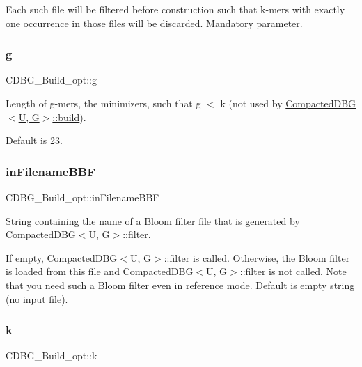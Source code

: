 Each such file will be filtered before construction such that k-\/mers with exactly one occurrence in those files will be discarded. Mandatory parameter. \mbox{\label{structCDBG__Build__opt_ab8d8ec72715094561d247b45ed5887f0}} 
\subsubsection{\texorpdfstring{g}{g}}
{\footnotesize\ttfamily C\+D\+B\+G\+\_\+\+Build\+\_\+opt\+::g}



Length of g-\/mers, the minimizers, such that g $<$ k (not used by \hyperlink{classCompactedDBG_a6021ad2fe7b11998b886bc5fd9e1a4ba}{Compacted\+D\+B\+G$<$\+U, G$>$\+::build}). 

Default is 23. \mbox{\label{structCDBG__Build__opt_aede0acb7ddd4b5bf7c6c539a86461d15}} 
\subsubsection{\texorpdfstring{in\+Filename\+B\+BF}{inFilenameBBF}}
{\footnotesize\ttfamily C\+D\+B\+G\+\_\+\+Build\+\_\+opt\+::in\+Filename\+B\+BF}



String containing the name of a Bloom filter file that is generated by Compacted\+D\+B\+G$<$\+U, G$>$\+::filter. 

If empty, Compacted\+D\+B\+G$<$\+U, G$>$\+::filter is called. Otherwise, the Bloom filter is loaded from this file and Compacted\+D\+B\+G$<$\+U, G$>$\+::filter is not called. Note that you need such a Bloom filter even in reference mode. Default is empty string (no input file). \mbox{\label{structCDBG__Build__opt_af59eb333394387f84dcf35ab740bd482}} 
\subsubsection{\texorpdfstring{k}{k}}
{\footnotesize\ttfamily C\+D\+B\+G\+\_\+\+Build\+\_\+opt\+::k}



